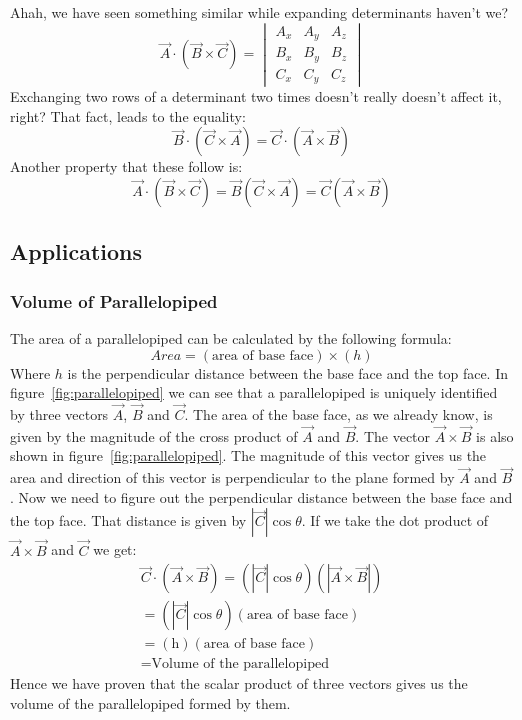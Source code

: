             Ahah, we have seen something similar while expanding determinants haven't we?
            \begin{equation}\label{eq:scalartriple}
            \vec{A}\cdot\left(\vec{B}\times\vec{C}\right) = \begin{vmatrix}A_x & A_y & A_z\\ B_x & B_y & B_z\\ C_x & C_y & C_z\end{vmatrix}
            \end{equation}
            Exchanging two rows of a determinant two times doesn't really doesn't affect it, right? That fact, leads to the equality:
            $$\vec{B}\cdot\left(\vec{C}\times\vec{A}\right) = \vec{C}\cdot\left(\vec{A}\times\vec{B}\right)$$
            Another property that these follow is:
            $$\vec{A}\cdot\left(\vec{B}\times\vec{C}\right) = \vec{B}\left(\vec{C}\times\vec{A}\right) = \vec{C}\left(\vec{A}\times\vec{B}\right)$$
        \subsection{Applications}
            \subsubsection{Volume of Parallelopiped}
                
                The area of a parallelopiped can be calculated by the following formula:
                $$Area = (\textrm{area of base face})\times(h)$$
                Where $h$ is the perpendicular distance between the base face and the top face.
                In figure~\ref{fig:parallelopiped} we can see that a parallelopiped is uniquely identified by three vectors $\vec{A}$, $\vec{B}$ and $\vec{C}$. The area of the base face, as we already know, is given by the magnitude of the cross product of $\vec{A}$ and $\vec{B}$. The vector $\vec{A}\times\vec{B}$ is also shown in figure~\ref{fig:parallelopiped}. The magnitude of this vector gives us the area and direction of this vector is perpendicular to the plane formed by $\vec{A}$ and $\vec{B}$. Now we need to figure out the perpendicular distance between the base face and the top face. That distance is given by $|\vec{C}|\cos\theta$. If we take the dot product of $\vec{A}\times\vec{B}$ and $\vec{C}$ we get:
                \begin{align*}
                    \vec{C}\cdot\left(\vec{A}\times\vec{B}\right) = \left(|\vec{C}|\cos\theta\right)\left(|\vec{A}\times\vec{B}|\right)\\ 
                    = \left(|\vec{C}|\cos\theta\right)\left(\textrm{area of base face}\right)\\
                    = \left(\textrm{h}\right)\left(\textrm{area of base face}\right)\\
                    = \textrm{Volume of the parallelopiped}
                \end{align*}
                Hence we have proven that the scalar product of three vectors gives us the volume of the parallelopiped formed by them.
